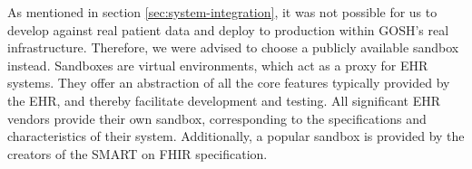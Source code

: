 \documentclass[sigconf]{acmart}
\begin{document}
As mentioned in section \ref{sec:system-integration}, it was not possible for us to develop against real patient data and deploy to production within GOSH's real infrastructure. %
Therefore, we were advised to choose a publicly available sandbox instead. Sandboxes are virtual environments, which act as a proxy for EHR systems. They offer an abstraction of all the core features typically provided by the EHR, and thereby facilitate development and testing. All significant EHR vendors provide their own sandbox, corresponding to the specifications and characteristics of their system. Additionally, a popular sandbox is provided by the creators of the SMART on FHIR specification.%
\end{document}
